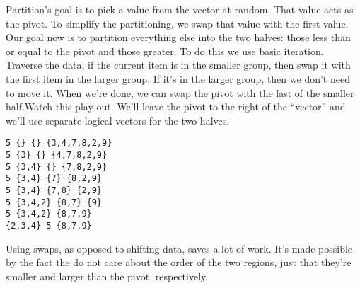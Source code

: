 \documentclass[]{tufte-handout}
\begin{document}
Partition's goal is to pick a value from the vector at random. That value acts as the pivot. To simplify the partitioning, we swap that value with the first value. Our goal now is to partition everything else into the two halves: those less than or equal to the pivot and those greater.  To do this we use basic iteration. Traverse the data, if the current item is in the smaller group, then swap it with the first item in the larger group. If it's in the larger group, then we don't need to move it. When we're done, we can swap the pivot with the last of the smaller half.Watch this play out. We'll leave the pivot to the right of the ``vector'' and we'll use separate logical vectors for the two halves. 
\begin{verbatim}
5 {} {} {3,4,7,8,2,9}
5 {3} {} {4,7,8,2,9}
5 {3,4} {} {7,8,2,9}
5 {3,4} {7} {8,2,9}
5 {3,4} {7,8} {2,9}
5 {3,4,2} {8,7} {9}
5 {3,4,2} {8,7,9}
{2,3,4} 5 {8,7,9}
\end{verbatim}
Using swaps, as opposed to shifting data, saves a lot of work. It's made possible by the fact the do not care about the order of the two regions, just that they're smaller and larger than the pivot, respectively. 
\end{document}
